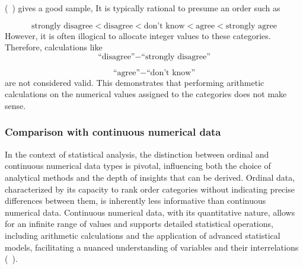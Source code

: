 \documentclass{article}
\begin{document}
(~\textcite{Johnson1999}) gives a good sample,
 It is typically rational to presume an order such as

 \[
 \text{strongly disagree} < \text{disagree} < \text{don’t know} < \text{agree} < \text{strongly agree}
\]
 However, it is often illogical to allocate integer values to these categories. Therefore, calculations like
\[
\text{``disagree''} - \text{``strongly disagree''}
\]

\[
\text{``agree''} - \text{``don't know''}
\]
are not considered valid. 
This demonstrates that performing arithmetic calculations on the numerical values assigned to the categories does not make sense.


\subsubsection*{Comparison with continuous numerical data}

In the context of statistical analysis, the distinction between ordinal and continuous numerical data types is pivotal, influencing both the choice of analytical methods and the depth of insights that can be derived. 
Ordinal data, characterized by its capacity to rank order categories without indicating precise differences between them, is inherently less informative than continuous numerical data. 
Continuous numerical data, with its quantitative nature, allows for an infinite range of values and supports detailed statistical operations, including arithmetic calculations and the application of advanced statistical models, facilitating a nuanced understanding of variables and their interrelations (~\cite{Stevens1946}).
\end{document}
